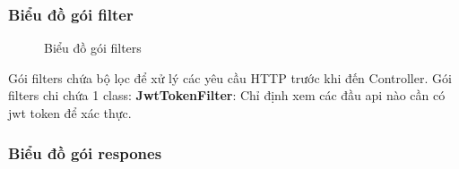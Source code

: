 \documentclass[../DoAn.tex]{subfiles}
\begin{document}
\subsubsection{Biểu đồ gói filter}
\begin{figure}[H]
    \centering
    \caption{Biểu đồ gói filters}
    \label{fig:Fig8}
\end{figure}
Gói filters chứa bộ lọc để xử lý các yêu cầu HTTP trước khi đến Controller. Gói filters chi chứa 1 class:
\textbf{JwtTokenFilter}: Chỉ định xem các đầu api nào cần có jwt token để xác thực.

\subsubsection{Biểu đồ gói respones}
\end{document}
